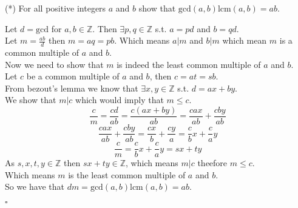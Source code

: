 \documentclass{exam}
\begin{document}
\begin{questions}

    \pagebreak
    \question (*) For all positive integers $a$ and $b$ show that $\text{gcd}(a,b) \text{lcm}(a,b)=ab$.
    \begin{solution}
        Let $d = \text{gcd}$ for $a,b \in \mathbb{Z}$. Then $\exists p,q \in \mathbb{Z}$ s.t. $a = pd$ and $b = qd$.
        \\Let $m = \frac{ab}{d}$ then $m = aq = pb$. Which means $a|m$ and $b|m$ which mean $m$ is a common multiple of $a$ and $b$.
        \\Now we need to show that $m$ is indeed the least common multiple of $a$ and $b$.
        \\Let $c$ be a common multiple of $a$ and $b$, then $c = at = sb$.
        \\From bezout's lemma we know that $\exists x,y \in \mathbb{Z}$ s.t. $d = ax + by$.
        \\We show that $m|c$ which would imply that $m \leq c$.
        $$\frac{c}{m} =  \frac{cd}{ab} = \frac{c(ax + by)}{ab} = \frac{cax}{ab} + \frac{cby}{ab}$$
        $$\frac{cax}{ab} + \frac{cby}{ab} = \frac{cx}{b} + \frac{cy}{a} = \frac{c}{b}x + \frac{c}{a}y$$
        $$\frac{c}{m} = \frac{c}{b}x + \frac{c}{a}y = sx + ty$$
        As $s,x,t,y \in \mathbb{Z}$ then $sx + ty \in \mathbb{Z}$, which means $m|c$ theefore $m \leq c$.
        \\Which means $m$ is the least common multiple of $a$ and $b$.
        \\So we have that $dm = \text{gcd}(a,b) \text{lcm}(a,b) = ab$.
        \begin{flushright}
            $\square$
        \end{flushright}
    \end{solution}


\end{questions}
\end{document}
